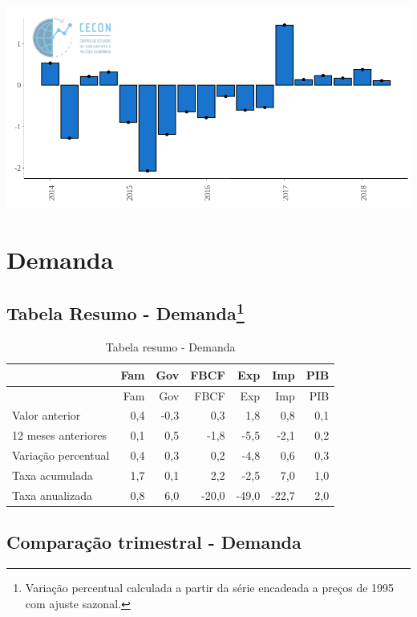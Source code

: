 \documentclass[11pt,portuguese,]{article}
\let\rmarkdownfootnote\footnote%
\def\footnote{\protect\rmarkdownfootnote}
\begin{document}
\begin{center}\includegraphics[width=1\linewidth]{Grafico_VA} \end{center}

\section{Demanda}\label{demanda}

\subsection[Tabela Resumo - Demanda]{\texorpdfstring{Tabela Resumo -
Demanda\footnote{Variação percentual calculada a partir da série
  encadeada a preços de 1995 com ajuste sazonal.}}{Tabela Resumo - Demanda}}\label{tabela-resumo---demanda4}

\begin{longtable}[]{@{}lrrrrrr@{}}
\caption{Tabela resumo - Demanda}\tabularnewline
\toprule
& Fam & Gov & FBCF & Exp & Imp & PIB\tabularnewline
\midrule
\endfirsthead
\toprule
& Fam & Gov & FBCF & Exp & Imp & PIB\tabularnewline
\midrule
\endhead
Valor anterior & 0,4 & -0,3 & 0,3 & 1,8 & 0,8 & 0,1\tabularnewline
12 meses anteriores & 0,1 & 0,5 & -1,8 & -5,5 & -2,1 &
0,2\tabularnewline
Variação percentual & 0,4 & 0,3 & 0,2 & -4,8 & 0,6 & 0,3\tabularnewline
Taxa acumulada & 1,7 & 0,1 & 2,2 & -2,5 & 7,0 & 1,0\tabularnewline
Taxa anualizada & 0,8 & 6,0 & -20,0 & -49,0 & -22,7 & 2,0\tabularnewline
\bottomrule
\end{longtable}

\subsection{Comparação trimestral -
Demanda}\label{comparacao-trimestral---demanda}
\end{document}
